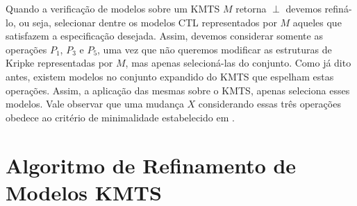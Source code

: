 \documentclass[normaltoc,capchap,capsec,times]{abnt}
\newtheorem{defi}{Definição}[section]
\begin{document}
%
%
%

Quando a verificação de modelos sobre um KMTS $M$ retorna $\perp$ devemos refiná-lo, ou seja, selecionar dentre os modelos CTL representados por $M$ aqueles que satisfazem a especificação desejada. Assim, devemos considerar somente as operações $P_1$, $P_3$ e $P_5$, uma vez que não queremos modificar as estruturas de Kripke representadas por $M$, mas apenas selecioná-las do conjunto. Como já dito antes, existem modelos no conjunto expandido do KMTS que espelham estas operações. Assim, a aplicação das mesmas sobre o KMTS, apenas seleciona esses modelos. Vale observar que uma mudança $X$ considerando essas três operações obedece ao critério de minimalidade  estabelecido em \cite{aline}.




\section{Algoritmo de Refinamento de Modelos KMTS}
\label{sec:refmodelkmts}

%
\end{document}
